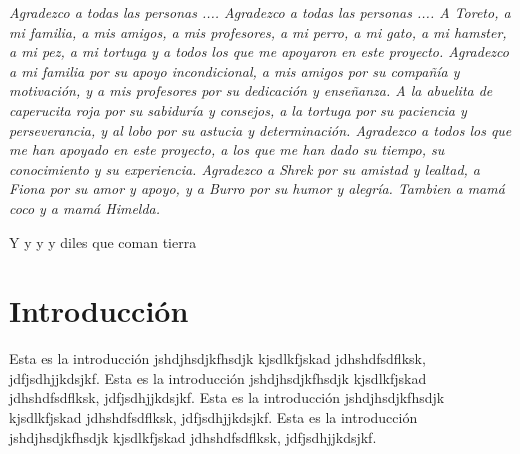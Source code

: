 \documentclass[12pt,letterpaper,spanish]{report}
\newenvironment{dedication}{\newpage\large\null\em\vskip1in}%
{\vfill}
\begin{document}
        \thispagestyle{empty}

        \begin{dedication}
           Agradezco a todas las personas .... Agradezco a todas las personas ....
           A Toreto, a mi familia, a mis amigos, a mis profesores, a mi perro, a mi gato, a mi hamster, a mi pez, a mi tortuga y a todos los que me apoyaron en este proyecto.
           Agradezco a mi familia por su apoyo incondicional, a mis amigos por su compañía y motivación, y a mis profesores por su dedicación y enseñanza.
           A la abuelita de caperucita roja por su sabiduría y consejos, a la tortuga por su paciencia y perseverancia, y al lobo por su astucia y determinación.
           Agradezco a todos los que me han apoyado en este proyecto, a los que me han dado su tiempo, su conocimiento y su experiencia.
           Agradezco a Shrek por su amistad y lealtad, a Fiona por su amor y apoyo, y a Burro por su humor y alegría.
           Tambien a mamá coco y a mamá Himelda.


           Y y y y diles que coman tierra
        \end{dedication}




\tableofcontents



\oddsidemargin 0.2in \textwidth 6.5in \topmargin -0.25in
\textheight 9in \pagestyle{myheadings}

\newpage



\chapter{Introducción}
\newpage


Esta es la introducción jshdjhsdjkfhsdjk kjsdlkfjskad jdhshdfsdflksk, jdfjsdhjjkdsjkf.
Esta es la introducción jshdjhsdjkfhsdjk kjsdlkfjskad jdhshdfsdflksk, jdfjsdhjjkdsjkf.
Esta es la introducción jshdjhsdjkfhsdjk kjsdlkfjskad jdhshdfsdflksk, jdfjsdhjjkdsjkf.
Esta es la introducción jshdjhsdjkfhsdjk kjsdlkfjskad jdhshdfsdflksk, jdfjsdhjjkdsjkf.
\\
\end{document}
